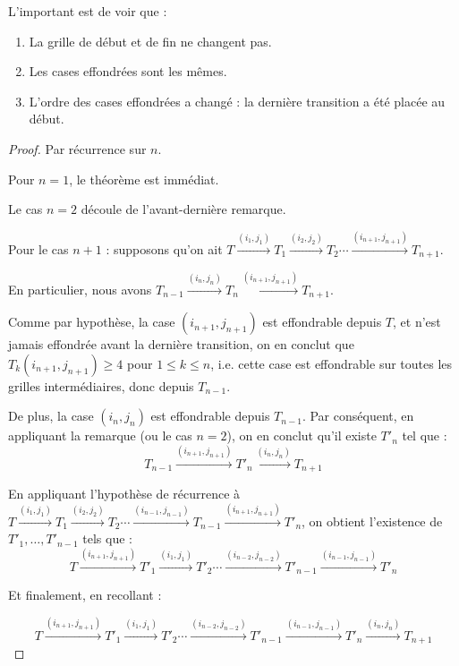 \begin{rem}L'important est de voir que : 
\begin{enumerate}
\item La grille de début et de fin ne changent pas.
\item Les cases effondrées sont les mêmes.
\item L'ordre des cases effondrées a changé : la dernière transition a été placée au début.
\end{enumerate}
\end{rem}
 \begin{proof}
 Par récurrence sur $n$.
 
 Pour $n=1$, le théorème est immédiat.
 
 Le cas $n=2$ découle de l'avant-dernière remarque.
 
 Pour le cas $n+1$ : supposons qu'on ait $T\xrightarrow{(i_1,j_1)}T_1\xrightarrow{(i_2,j_2)}T_2\cdots\xrightarrow{(i_{n+1},j_{n+1})}T_{n+1}$.
 
 En particulier, nous avons $T_{n-1}\xrightarrow{(i_{n},j_{n})}T_n\xrightarrow{(i_{n+1},j_{n+1})}T_{n+1}$.
 
 Comme par hypothèse, la case $(i_{n+1},j_{n+1})$ est effondrable depuis $T$, et n'est jamais effondrée avant la dernière transition, on en conclut que $T_k(i_{n+1},j_{n+1})\geqslant 4$ pour $1\leqslant k \leqslant n$, i.e. cette case est effondrable sur toutes les grilles intermédiaires, donc depuis $T_{n-1}$.
 
 De plus, la case $(i_{n},j_{n})$ est effondrable depuis $T_{n-1}$. Par conséquent, en appliquant la remarque (ou le cas $n=2$), on en conclut qu'il existe $T'_n$ tel que : 
 $$T_{n-1}\xrightarrow{(i_{n+1},j_{n+1})}T'_n\xrightarrow{(i_{n},j_{n})}T_{n+1}$$
 
 En appliquant l'hypothèse de récurrence à $T\xrightarrow{(i_1,j_1)}T_1\xrightarrow{(i_2,j_2)}T_2\cdots\xrightarrow{(i_{n-1},j_{n-1})}T_{n-1}\xrightarrow{(i_{n+1},j_{n+1})}T'_n$, on obtient l'existence de $T'_1, \ldots, T'_{n-1}$ tels que : 
$$T\xrightarrow{(i_{n+1},j_{n+1})}T'_1\xrightarrow{(i_1,j_1)}T'_2\cdots\xrightarrow{(i_{n-2},j_{n-2})}T'_{n-1}\xrightarrow{(i_{n-1},j_{n-1})}T'_n$$

Et finalement, en recollant : 

$$T\xrightarrow{(i_{n+1},j_{n+1})}T'_1\xrightarrow{(i_1,j_1)}T'_2\cdots\xrightarrow{(i_{n-2},j_{n-2})}T'_{n-1}\xrightarrow{(i_{n-1},j_{n-1})}T'_n\xrightarrow{(i_{n},j_{n})}T_{n+1}$$
 
  \end{proof}

